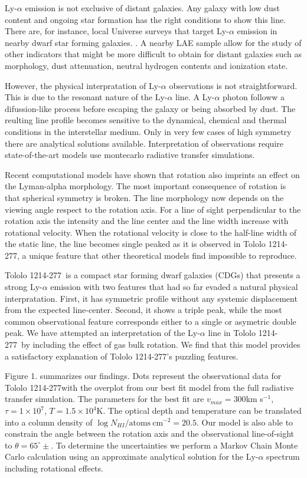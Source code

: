 \documentclass[a4paper, usenatbib, 12pt]{article}
\newcommand{\tol}{Tololo 1214-277}
\newcommand{\kms}{km s$^{-1}$}
\begin{document}
{Ly-$\alpha$ emission is not exclusive of distant galaxies. 
Any galaxy with low dust content and ongoing star formation has the
right conditions to show this line.  
There are, for instance,  local Universe surveys that target
Ly-$\alpha$ emission in nearby dwarf star forming galaxies. 
\cite{LARS}. 
A nearby LAE sample allow for the study of other indicators that
might be more difficult to obtain for distant galaxies such as
morphology, dust attenuation, neutral hydrogen contents and ionization
state.  

However, the physical interpratation of Ly-$\alpha$ observations is
not straightforward. 
This is due to the resonant nature of the Ly-$\alpha$ line. 
A Ly-$\alpha$ photon followw a difussion-like process before escaping
the galaxy or being absorbed by dust. 
The reulting line profile becomes sensitive to the dynamical, chemical
and thermal conditions in the interstellar medium. 
Only in very few cases of high symmetry there are analytical solutions
available. 
Interpretation of observations require state-of-the-art models use
montecarlo radiative transfer simulations.

Recent computational models \cite{GaravitoCamargo2014} have
shown that rotation also imprints an effect on the Lyman-alpha
morphology.  
The most important consequence of rotation is that spherical 
symmetry is broken.
The line morphology now depends on the viewing angle respect to the
rotation axis.  
For a line of sight perpendicular to the rotation axis the intensity
and the line center and the line width increase with rotational
velocity.  
When the rotational velocity is close to the half-line width of the
static line, the line becomes single peaked as it is observed in
\tol, a unique feature that other theoretical models find
impossible to reproduce.

\tol\ is a compact star forming dwarf galaxies (CDGs) that presents a
strong Ly-$\alpha$ emission \cite{Thuan97} with two features that had
so far evaded a natural physical interpratation.
First, it has symmetric profile  without any systemic displacement
from the expected line-center. 
Second, it shows a triple peak, while the most common observational
feature corresponds either to a single or asymetric double peak. 
We have attempted an interpretation of the Ly-$\alpha$ line in
\tol\ by including the effect of gas bulk rotation.
We find that this model provides a satisfactory explanation of \tol's
puzzling features. 


Figure 1. summarizes our findings.
Dots represent the observational data for \tol with the
overplot from our best fit model from the full radiative transfer
simulation.   
The parameters for the best fit are
$v_{max}=300$\kms, $\tau=1\times10^7$, $T=1.5\times 10^{4}$K.
The optical depth and temperature can be translated into a column
density of $\log N_{HI} / \mathrm{atoms\ cm}^{-2} =
  20.5$.   
Our model is also able to constrain the angle
between the rotation axis and the observational line-of-sight to $\theta=65^{\circ}\pm$.
To determine the uncertainties we perform a Markov Chain Monte
Carlo calculation using an approximate analytical solution for the
Ly-$\alpha$ spectrum including rotational effects.


}
\end{document}

